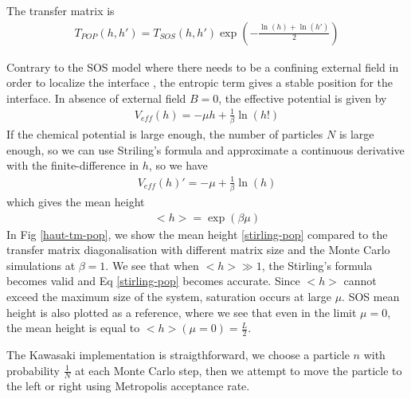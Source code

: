 The transfer matrix is
\begin{align}
T_{POP}(h,h') = T_{SOS}(h,h') \exp \left(- \frac{\ln(h)+\ln(h')}{2} \right)
\end{align}

Contrary to the SOS model where there needs to be a confining external field in order to localize the interface \cite{burkhardt_localisation-delocalisation_1981,chui_pinning_1981}, the entropic term gives a stable position for the interface. In absence of external field $B=0$, the effective potential is given by
\begin{align} 
    V_{eff}(h) = - \mu h + \frac{1}{\beta}\ln(h!)
\end{align}
If the chemical potential is large enough, the number of particles $N$ is large enough, so we can use Striling's formula and approximate a continuous derivative with the finite-difference in $h$, so we have
\begin{align} 
    V_{eff}(h)' = - \mu +\frac{1}{\beta} \ln(h)
\end{align}which gives the mean height 
\begin{align} 
    <h> = \exp(\beta \mu) 
\label{stirling-pop}
    \end{align}
    In Fig \ref{haut-tm-pop}, we show the mean height \eqref{stirling-pop} compared to the transfer matrix diagonalisation with different matrix size and the Monte Carlo simulations at $\beta=1$. We see that when $ <h> \gg 1$, the Stirling's formula becomes valid and Eq \eqref{stirling-pop} becomes accurate. Since $<h>$ cannot exceed the maximum size of the system, saturation occurs at large $\mu$. SOS mean height is also plotted as a reference, where we see that even in the limit $\mu=0$, the mean height is equal to $<h>(\mu=0) = \frac{L}{2}$.

The Kawasaki implementation is straigthforward, we choose a particle $n$ with probability $\frac{1}{N}$ at each Monte Carlo step, then we attempt to move the particle to the left or right using Metropolis acceptance rate.

